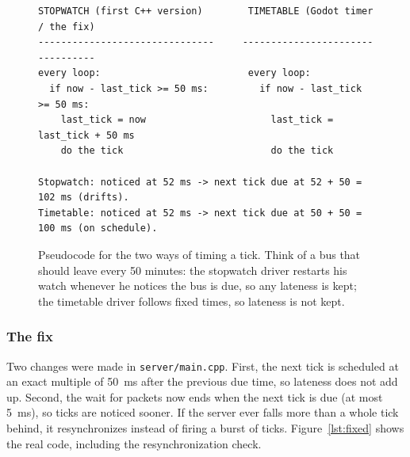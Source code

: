 \documentclass[11pt]{article}
\begin{document}
\begin{figure}[H]
\begin{lstlisting}[language={}]
STOPWATCH (first C++ version)        TIMETABLE (Godot timer / the fix)
-------------------------------     ---------------------------------
every loop:                          every loop:
  if now - last_tick >= 50 ms:         if now - last_tick >= 50 ms:
    last_tick = now                      last_tick = last_tick + 50 ms
    do the tick                          do the tick

Stopwatch: noticed at 52 ms -> next tick due at 52 + 50 = 102 ms (drifts).
Timetable: noticed at 52 ms -> next tick due at 50 + 50 = 100 ms (on schedule).
\end{lstlisting}
\caption{Pseudocode for the two ways of timing a tick. Think of a bus that should leave every 50 minutes: the stopwatch driver restarts his watch whenever he notices the bus is due, so any lateness is kept; the timetable driver follows fixed times, so lateness is not kept.}
\label{lst:pseudo}
\end{figure}

\subsubsection{The fix}\label{sec:thefix}
Two changes were made in \texttt{server/main.cpp}. First, the next tick is scheduled at an exact multiple of 50~ms after the previous due time, so lateness does not add up. Second, the wait for packets now ends when the next tick is due (at most 5~ms), so ticks are noticed sooner. If the server ever falls more than a whole tick behind, it resynchronizes instead of firing a burst of ticks. Figure~\ref{lst:fixed} shows the real code, including the resynchronization check.
\end{document}
